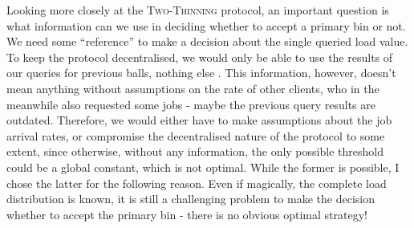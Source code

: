 Looking more closely at the \textsc{Two-Thinning} protocol, an important question is what information can we use in deciding whether to accept a primary bin or not. We need some ``reference'' to make a decision about the single queried load value. To keep the protocol decentralised, we would only be able to use the results of our queries for previous balls, nothing else . This information, however, doesn't mean anything without assumptions on the rate of other clients, who in the meanwhile also requested some jobs - maybe the previous query results are outdated. Therefore, we would either have to make assumptions about the job arrival rates, or compromise the decentralised nature of the protocol to some extent, since otherwise, without any information, the only possible threshold could be a global constant, which is not optimal. While the former is possible, I chose the latter for the following reason. Even if magically, the complete load distribution is known, it is still a challenging problem to make the decision whether to accept the primary bin - there is no obvious optimal strategy!  


